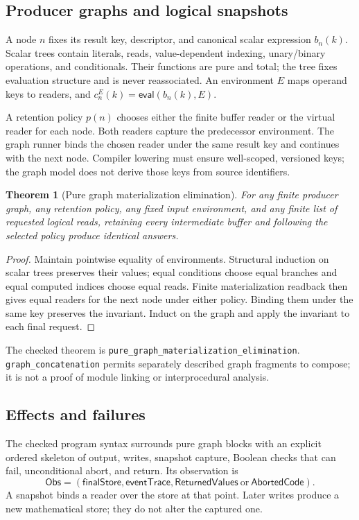 \documentclass[11pt]{article}
\newtheorem{theorem}{Theorem}
\begin{document}
\subsection{Producer graphs and logical snapshots}
A node $n$ fixes its result key, descriptor, and canonical scalar expression
$b_n(k)$. Scalar trees contain literals, reads, value-dependent indexing,
unary/binary operations, and conditionals. Their functions are pure and total;
the tree fixes evaluation structure and is never reassociated. An environment
$E$ maps operand keys to readers, and $c_n^E(k)=\mathsf{eval}(b_n(k),E)$.

A retention policy $p(n)$ chooses either the finite buffer reader or the
virtual reader for each node. Both readers capture the predecessor environment.
The graph runner binds the chosen reader under the same result key and continues
with the next node. Compiler lowering must ensure well-scoped, versioned keys;
the graph model does not derive those keys from source identifiers.

\begin{theorem}[Pure graph materialization elimination]
For any finite producer graph, any retention policy, any fixed input environment,
and any finite list of requested logical reads, retaining every intermediate
buffer and following the selected policy produce identical answers.
\end{theorem}
\begin{proof}
Maintain pointwise equality of environments. Structural induction on scalar
trees preserves their values; equal conditions choose equal branches and equal
computed indices choose equal reads. Finite materialization readback then gives
equal readers for the next node under either policy. Binding them under the same
key preserves the invariant. Induct on the graph and apply the invariant to
each final request.
\end{proof}
The checked theorem is \texttt{pure\_graph\_materialization\_elimination}.
\texttt{graph\_concatenation} permits separately described graph fragments to
compose; it is not a proof of module linking or interprocedural analysis.

\subsection{Effects and failures}
The checked program syntax surrounds pure graph blocks with an explicit ordered
skeleton of output, writes, snapshot capture, Boolean checks that can fail,
unconditional abort, and return. Its observation is
\[
 \mathsf{Obs}=(\mathsf{finalStore},\mathsf{eventTrace},
               \mathsf{ReturnedValues}\ \text{or}\ \mathsf{AbortedCode}).
\]
A snapshot binds a reader over the store at that point. Later writes produce a
new mathematical store; they do not alter the captured one.
\end{document}
